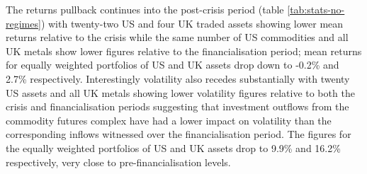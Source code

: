 \documentclass[]{elsarticle} %
\begin{document}
\medskip\setlength{\parindent}{0pt}

The returns pullback continues into the post-crisis period (table \ref{tab:stats-no-regimes}) with twenty-two US and four UK traded assets showing lower mean returns relative to the crisis while the same number of US commodities and all UK metals show lower figures relative to the financialisation period; mean returns for equally weighted portfolios of US and UK assets drop down to -0.2\% and 2.7\% respectively. Interestingly volatility also recedes substantially with twenty US assets and all UK metals showing lower volatility figures relative to both the crisis and financialisation periods suggesting that investment outflows from the commodity futures complex have had a lower impact on volatility than the corresponding inflows witnessed over the financialisation period. The figures for the equally weighted portfolios of US and UK assets drop to 9.9\% and 16.2\% respectively, very close to pre-financialisation levels.\\
\end{document}
